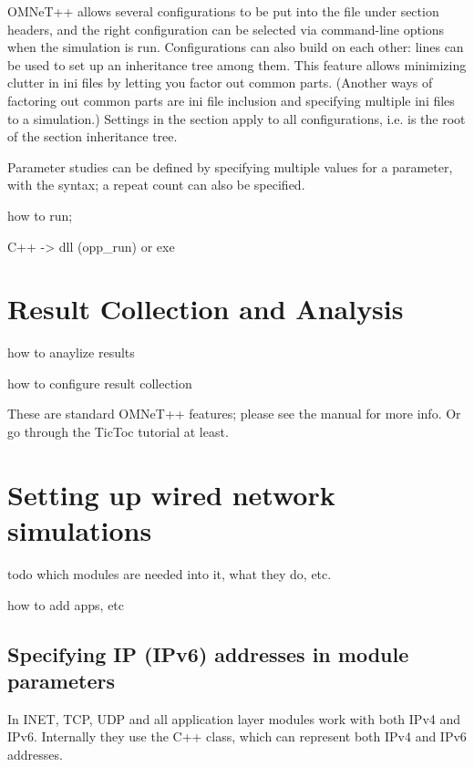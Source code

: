 OMNeT++ allows several configurations to be put into the 
file under  section headers, and the right
configuration can be selected via command-line options when the simulation
is run. Configurations can also build on each other: 
lines can be used to set up an inheritance tree among them. This feature
allows minimizing clutter in ini files by letting you factor out common
parts. (Another ways of factoring out common parts are ini file inclusion
and specifying multiple ini files to a simulation.) Settings in the
\ttt{[General]} section apply to all configurations, i.e. \ttt{[General]}
is the root of the section inheritance tree.

Parameter studies can be defined by specifying multiple values for a
parameter, with the  syntax;
a repeat count can also be specified.

how to run;

C++ -> dll (opp\_run) or exe

\section{Result Collection and Analysis}

how to anaylize results

how to configure result collection


\begin{note}
These are standard OMNeT++ features; please see the manual for more info.
Or go through the TicToc tutorial at least.
\end{note}

\section{Setting up wired network simulations}

todo which modules are needed into it, what they do, etc.

how to add apps, etc


\subsection{Specifying IP (IPv6) addresses in module parameters}

In INET, TCP, UDP and all application layer modules work with
both IPv4 and IPv6. Internally they use the  C++ class, which
can represent both IPv4 and IPv6 addresses.

